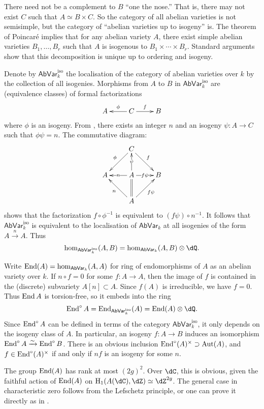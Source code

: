There need not be a complement to $B$ ``one the nose.'' That is, there may not 
exist $C$ such that $A\simeq B\times C$. So the category of all abelian 
varieties is not semisimple, but the category of ``abelian varieties up to 
isogeny'' is. The theorem of Poincar\'e implies that for any abelian variety 
$A$, there exist simple abelian varieties $B_1,\dots,B_r$ such that $A$ is 
isogenous to $B_1\times\cdots \times B_r$. Standard arguments show that this 
decomposition is unique up to ordering and isogeny. 

Denote by $\mathsf{AbVar}_k^\mathrm{iso}$ the localisation of the category of 
abelian varieties over $k$ by the collection of all isogenies. Morphisms from 
$A$ to $B$ in $\mathsf{AbVar}_k^\mathrm{iso}$ are (equivalence classes) of 
formal factorizations 
\[\xymatrix{
  A 
    & C \ar[l]_-\phi \ar[r]^-f 
    & B
}\]
where $\phi$ is an isogeny. From \cite[V.18]{mu08}, there exists an integer $n$ 
and an isogeny $\psi:A\to C$ such that $\phi\psi=n$. The commutative diagram:
\[\xymatrix{
  & C \ar[dl]_-\phi \ar[dr]^-f \\
  A & A \ar[l]|-n \ar[u]|-\psi \ar[r]|-{f\psi} \ar@{=}[d] & B \\
  & A \ar[ul]^-n \ar[ur]_-{f\psi}
}\]
shows that the factorization $f\circ \phi^{-1}$ is equivalent to 
$(f\psi)\circ n^{-1}$. It follows that $\mathsf{AbVar}_k^\mathrm{iso}$ is 
equivalent to the localisation of $\mathsf{AbVar}_k$ at all isogenies of the 
form $A\xrightarrow n A$. Thus 
\[
  \hom_{\mathsf{AbVar}_k^\mathrm{iso}}(A,B) = \hom_{\mathsf{AbVar}_k}(A,B)\otimes\dQ \text{.}
\]

Write $\operatorname{End}(A)=\hom_{\mathsf{AbVar}_k}(A,A)$ for ring of endomorphisms of $A$ 
as an abelian variety over $k$. If $n\circ f=0$ for some $f:A\to A$, then the 
image of $f$ is contained in the (discrete) subvariety $A[n]\subset A$. Since 
$f(A)$ is irreducible, we have $f=0$. Thus $\operatorname{End} A$ is torsion-free, so it 
embeds into the ring
\[
  \End^\circ A = \End_{\mathsf{AbVar}_k^\mathrm{iso}}(A) = \End(A)\otimes\dQ \text{.}
\]
Since $\operatorname{End}^\circ A$ can be defined in terms of the category 
$\mathsf{AbVar}_{k}^\mathrm{iso}$, it only depends on the isogeny class of 
$A$. In particular, an isogeny $f:A\to B$ induces an isomorphism 
$\operatorname{End}^\circ A\xrightarrow\sim \operatorname{End}^\circ B$. 
There is an obvious inclusion $\operatorname{End}^\circ(A)^\times\supset\operatorname{Aut}(A)$, and  
$f\in \operatorname{End}^\circ(A)^\times$ if and only if $n f$ is an isogeny for some $n$.

The group $\operatorname{End}(A)$ has rank at most $(2 g)^2$. Over $\dC$, this is obvious, 
given the faithful action of $\operatorname{End}(A)$ on $\h_1(A(\dC),\dZ)\simeq \dZ^{2g}$. 
The general case in characteristic zero follows from the Lefschetz principle, 
or one can prove it directly as in \cite[IV.18.3]{mu08}. 

